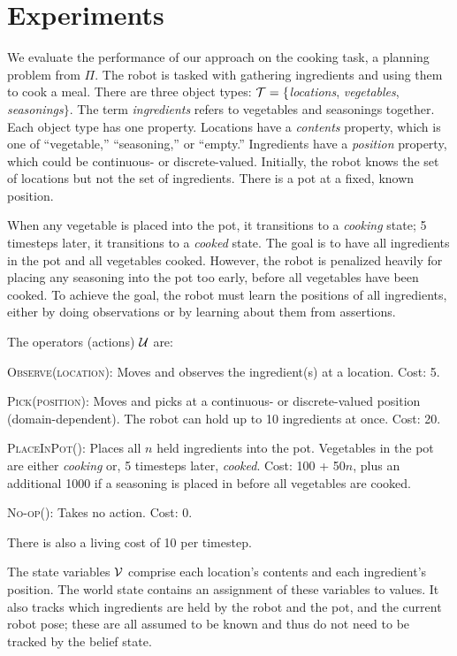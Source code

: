 \section{Experiments}
We evaluate the performance of our approach on the cooking task, a
planning problem from $\Pi$. The robot is tasked with gathering
ingredients and using them to cook a meal. There are three object
types: $\mathcal{T} = \{$\emph{locations}, \emph{vegetables},
\emph{seasonings}$\}$. The term \emph{ingredients} refers to
vegetables and seasonings together. Each object type has one
property. Locations have a \emph{contents} property, which is one of
``vegetable,'' ``seasoning,'' or ``empty.'' Ingredients have a
\emph{position} property, which could be continuous- or
discrete-valued. Initially, the robot knows the set of locations but
not the set of ingredients. There is a pot at a fixed, known position.

When any vegetable is placed into the pot, it transitions to a
\emph{cooking} state; 5 timesteps later, it transitions to a
\emph{cooked} state. The goal is to have all ingredients in the pot
and all vegetables cooked. However, the robot is penalized heavily for
placing any seasoning into the pot too early, before all vegetables
have been cooked. To achieve the goal, the robot must learn the
positions of all ingredients, either by doing observations or by
learning about them from assertions.

The operators (actions) $\mathcal{U}$ are:
\begin{tightlist}
\item \textsc{Observe(location)}: Moves and observes the ingredient(s)
  at a location. Cost: 5.
\item \textsc{Pick(position)}: Moves and picks at a continuous- or
  discrete-valued position (domain-dependent). The robot can
  hold up to 10 ingredients at once. Cost: 20.
\item \textsc{PlaceInPot()}: Places all $n$ held ingredients into the
  pot. Vegetables in the pot are either \emph{cooking} or, 5 timesteps
  later, \emph{cooked}. Cost: 100 + 50$n$, plus an additional 1000 if
  a seasoning is placed in before all vegetables are cooked.
\item \textsc{No-op()}: Takes no action. Cost: 0.
\end{tightlist}
There is also a living cost of 10 per timestep.

The state variables $\mathcal{V}$ comprise each location's contents and each
ingredient's position. The world state contains an assignment of these
variables to values. It also tracks which ingredients are held by the
robot and the pot, and the current robot pose; these are all assumed
to be known and thus do not need to be tracked by the belief state.

